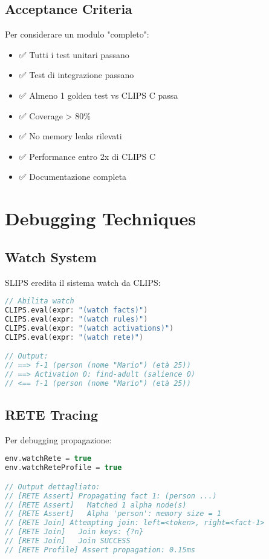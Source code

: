 \subsection{Acceptance Criteria}

Per considerare un modulo "completo":

\begin{itemize}
\item ✅ Tutti i test unitari passano
\item ✅ Test di integrazione passano
\item ✅ Almeno 1 golden test vs CLIPS C passa
\item ✅ Coverage > 80\%
\item ✅ No memory leaks rilevati
\item ✅ Performance entro 2x di CLIPS C
\item ✅ Documentazione completa
\end{itemize}

\section{Debugging Techniques}

\subsection{Watch System}

SLIPS eredita il sistema watch da CLIPS:

\begin{lstlisting}[language=Swift]
// Abilita watch
CLIPS.eval(expr: "(watch facts)")
CLIPS.eval(expr: "(watch rules)")
CLIPS.eval(expr: "(watch activations)")
CLIPS.eval(expr: "(watch rete)")

// Output:
// ==> f-1 (person (nome "Mario") (età 25))
// ==> Activation 0: find-adult (salience 0)
// <== f-1 (person (nome "Mario") (età 25))
\end{lstlisting}

\subsection{RETE Tracing}

Per debugging propagazione:

\begin{lstlisting}[language=Swift]
env.watchRete = true
env.watchReteProfile = true

// Output dettagliato:
// [RETE Assert] Propagating fact 1: (person ...)
// [RETE Assert]   Matched 1 alpha node(s)
// [RETE Assert]   Alpha 'person': memory size = 1
// [RETE Join] Attempting join: left=<token>, right=<fact-1>
// [RETE Join]   Join keys: {?n}
// [RETE Join]   Join SUCCESS
// [RETE Profile] Assert propagation: 0.15ms
\end{lstlisting}

